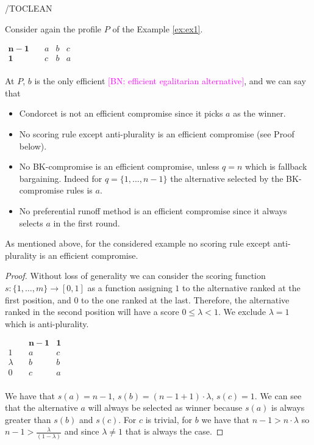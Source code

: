 \documentclass[version=3.21, pagesize, notitlepage, twoside=off, bibliography=totoc, DIV=calc, fontsize=12pt, a4paper]{scrartcl}
\newcommand{\commentBN}[1]{\textcolor{magenta}{\small$\big[$BN: #1$\big]$}}
\begin{document}
/TOCLEAN

\noindent Consider again the profile $P$ of the Example \ref{ex:ex1}. 
	\begin{center}
		$
		\begin{array}{cccc}
		\mathbf{n-1} \quad &a&b&c\\
		\mathbf{1} \quad &c&b&a\\
		\end{array}
		$
	\end{center}
	At $P$, $b$ is the only efficient \commentBN{efficient egalitarian alternative}, and we can say that 
\begin{itemize}
	\item Condorcet is not an efficient compromise since it picks $a$ as the winner.
	\item No scoring rule except anti-plurality is an efficient compromise (see Proof below).
	\item No BK-compromise is an efficient compromise, unless $q=n$ which is fallback bargaining. Indeed for $q=\{1,\dots, n-1\}$ the alternative selected by the BK-compromise rules is $a$.
	\item No preferential runoff method is an efficient compromise since it always selects $a$ in the first round.
\end{itemize}
As mentioned above, for the considered example no scoring rule except anti-plurality is an efficient compromise.
\begin{proof} Without loss of generality we can consider the scoring function $s:\{1,\dots,m\}\rightarrow [0,1]$ as a function assigning $1$ to the alternative ranked at the first position, and $0$ to the one ranked at the last. Therefore, the alternative ranked in the second position will have a score $0 \leq \lambda<1$. We exclude $\lambda = 1$ which is anti-plurality.
	\begin{center}
		$
		\begin{array}{ccc}
		\quad & \mathbf{n-1} &\mathbf{1}\\
		1 \quad &a&c\\
		\lambda \quad &b&b\\
		0 \quad &c&a\\
		\end{array}
		$
	\end{center}
	We have that $s(a)=n-1$, $s(b)=(n-1+1)\cdot \lambda$, $s(c)=1$. We can see that the alternative $a$ will always be selected as winner because $s(a)$ is always greater than $s(b)$ and $s(c)$. For $c$ is trivial, for $b$ we have that $n-1>n\cdot\lambda$ so $n-1>\frac{\lambda}{(1-\lambda)}$ and since $\lambda \neq 1$ that is always the case.
\end{proof}
\end{document}
